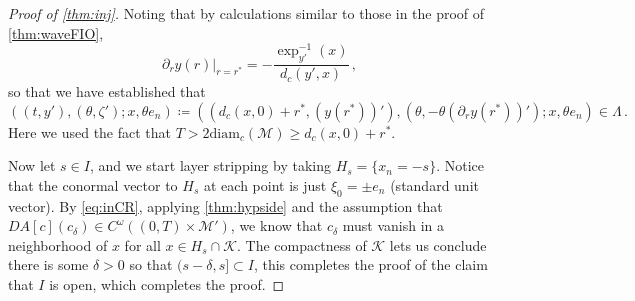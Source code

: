 \documentclass[
	fontsize=11pt, 
	twoside=false, 
	abstract=true, 
	a4paper,
]{scrartcl}
\newcommand{\eps}{\varepsilon}
\newcommand{\abs}[1]{\left\lvert#1\right\rvert}
\newcommand{\del}{\partial}
\begin{document}
\begin{proof}[Proof of \cref{thm:inj}]
	Noting that by calculations similar to those in the proof of \cref{thm:waveFIO}, 
	\[
		\del_r y(r)\vert_{r=r^\ast} = -\frac{\exp_{y'}^{-1}(x)}{d_c(y',x)}\,,
	\]
	so that we have established that
	\begin{equation}\label{eq:inCR}
		((t,y'),(\theta,\zeta');x,\theta e_n) \coloneqq \left((d_c(x,0)+r^\ast,(y(r^\ast))'),(\theta,-\theta(\del_r y(r^\ast))'); x,\theta e_n\right) \in \Lambda\,.
	\end{equation}
	Here we used the fact that $T> 2\mathrm{diam}_c(\mathcal{M}) \geq d_c(x,0)+r^\ast$.

	Now let $s\in I$, and we start layer stripping by taking $H_s = \{x_n = -s\}$. Notice that the conormal vector to $H_s$ at each point is just $\xi_0 = \pm e_n$ (standard unit vector). By \cref{eq:inCR}, applying \cref{thm:hypside} and the assumption that $DA[c](c_\delta) \in C^\omega((0,T)\times\mathcal{M}')$, we know that $c_\delta$ must vanish in a neighborhood of $x$ for all $x\in H_s \cap \mathcal{K}$. %
	The compactness of $\mathcal{K}$ lets us conclude there is some $\delta>0$ so that $(s-\delta,s]\subset I$, this completes the proof of the claim that $I$ is open, which completes the proof.
\end{proof}
\end{document}
